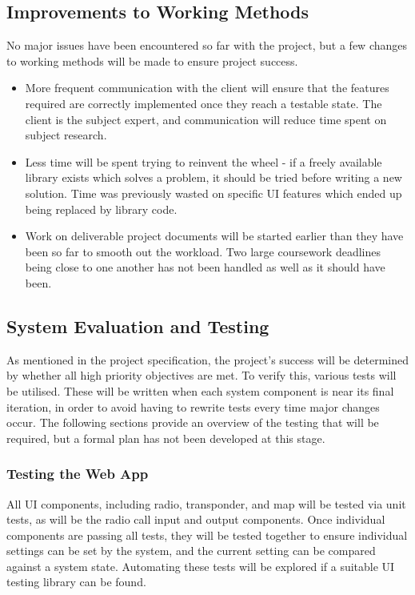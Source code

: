 \subsection{Improvements to Working Methods}
No major issues have been encountered so far with the project, but a few changes to working methods will be made to ensure project success. 
\begin{itemize}
    \item More frequent communication with the client will ensure that the features required are correctly implemented once they reach a testable state. The client is the subject expert, and communication will reduce time spent on subject research.
    \item Less time will be spent trying to reinvent the wheel - if a freely available library exists which solves a problem, it should be tried before writing a new solution. Time was previously wasted on specific UI features which ended up being replaced by library code.
    \item Work on deliverable project documents will be started earlier than they have been so far to smooth out the workload. Two large coursework deadlines being close to one another has not been handled as well as it should have been.
\end{itemize} 

\subsection{System Evaluation and Testing}
As mentioned in the project specification, the project's success will be determined by whether all high priority objectives are met. To verify this, various tests will be utilised. These will be written when each system component is near its final iteration, in order to avoid having to rewrite tests every time major changes occur. The following sections provide an overview of the testing that will be required, but a formal plan has not been developed at this stage.

\subsubsection{Testing the Web App}
All UI components, including radio, transponder, and map will be tested via unit tests, as will be the radio call input and output components. Once individual components are passing all tests, they will be tested together to ensure individual settings can be set by the system, and the current setting can be compared against a system state. Automating these tests will be explored if a suitable UI testing library can be found.

